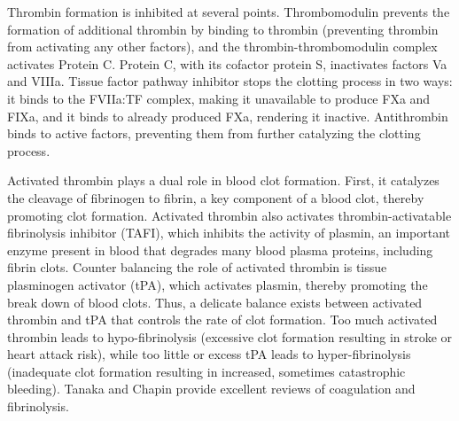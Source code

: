 \documentclass[11pt]{article}
\begin{document}
Thrombin formation is inhibited at several points. Thrombomodulin prevents the formation of additional thrombin by binding to thrombin (preventing thrombin from activating any other factors), and the thrombin-thrombomodulin complex activates Protein C. \cite{esmon1989roles} Protein C, with its cofactor protein S, inactivates factors Va and VIIIa. \citep{esmon1987anticoagulation}
 Tissue factor pathway inhibitor stops the clotting process in two ways: it binds to the FVIIa:TF complex, making it unavailable to produce FXa and FIXa, and it binds to already produced FXa, rendering it inactive. \cite{lwaleed2006tissue} Antithrombin binds to active factors, preventing them from further catalyzing the clotting process.

Activated thrombin plays a dual role in blood clot formation.
First, it catalyzes the cleavage of fibrinogen to fibrin, a key component of a blood clot, thereby promoting clot formation.
Activated thrombin also activates thrombin-activatable fibrinolysis inhibitor (TAFI), which inhibits the activity of plasmin, an important enzyme present in blood that degrades many blood plasma proteins, including fibrin clots.
Counter balancing the role of activated thrombin is tissue plasminogen activator (tPA), which activates plasmin, thereby promoting the break down of blood clots.
Thus, a delicate balance exists between activated thrombin and tPA that controls the rate of clot formation.
Too much activated thrombin leads to hypo-fibrinolysis (excessive clot formation resulting in stroke or heart attack risk),
while too little or excess tPA leads to hyper-fibrinolysis (inadequate clot formation resulting in increased, sometimes catastrophic bleeding).
Tanaka and Chapin \cite{Tanaka:2009wo,Chapin:2015aa} provide excellent reviews of coagulation and fibrinolysis.
\end{document}
